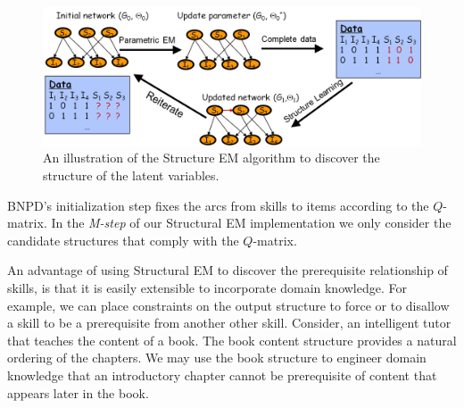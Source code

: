 \documentclass{edm_template}
\begin{document}
\begin{figure}
	\begin{center}
		\includegraphics[width=1.0\linewidth]{figures/sem.png}
	\end{center}
	\caption{\small An illustration of the Structure EM algorithm to discover the structure of the latent variables.}
	\label{fig:sem} 
\end{figure} 

BNPD's  initialization step
fixes the arcs from skills to items according to the ${Q}$-matrix.
In  the \emph{M-step} of our Structural EM implementation we only consider the candidate structures that comply with the ${Q}$-matrix.

An advantage of using Structural EM to discover the prerequisite relationship of skills, is that it is easily extensible to incorporate domain knowledge.
For example, we can  place constraints on the output structure to force or to disallow a skill to be a prerequisite from another other skill.
Consider,  an intelligent tutor that teaches the content of a book. 
The book content structure provides a natural ordering of the chapters. %
We may use the book structure to engineer domain knowledge that  an  introductory chapter cannot be prerequisite of content that appears later in the book.
\end{document}
